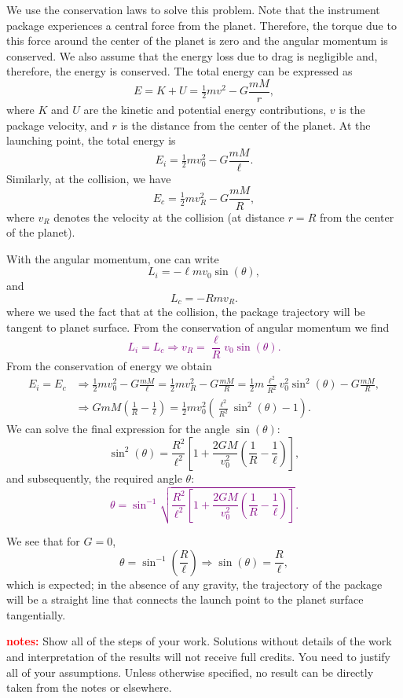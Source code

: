 \documentclass[12pt]{article}
\begin{document}
\begin{ex}
\begin{solution}
  We use the conservation laws to solve this problem. Note that the instrument package experiences a central force from the planet. Therefore, the torque due to this force around the center of the planet is zero and the angular momentum is conserved. We also assume that the energy loss due to drag is negligible and, therefore, the energy is conserved. The total energy can be expressed as
  $$E=K+U=\tfrac{1}{2}mv^2-G\frac{mM}{r},$$
  where $K$ and $U$ are the kinetic and potential energy contributions, $v$ is the package velocity, and $r$ is the distance from the center of the planet. At the launching point, the total energy is
  $$E_i=\tfrac{1}{2}mv_0^2-G\frac{mM}{\ell}.$$
  Similarly, at the collision, we have
  $$E_c=\tfrac{1}{2}mv_R^2-G\frac{mM}{R},$$
  where $v_R$ denotes the velocity at the collision (at distance $r=R$ from the center of the planet).

  With the angular momentum, one can write
  $$L_i=-\ell mv_0\sin(\theta),$$
  and
  $$L_c=-Rmv_R.$$
  where we used the fact that at the collision, the package trajectory will be tangent to planet surface. From the conservation of angular momentum we find\textcolor{purple}{
  $$L_i=L_c\Rightarrow v_R=\frac{\ell}{R}v_0\sin(\theta).$$}%
  From the conservation of energy we obtain
  \begin{align*}
    E_i=E_c&\Rightarrow \tfrac{1}{2}mv_0^2-G\frac{mM}{\ell}=\tfrac{1}{2}mv_R^2-G\frac{mM}{R}=\tfrac{1}{2}m\frac{\ell^2}{R^2}v_0^2\sin^2(\theta)-G\frac{mM}{R},\\
    &\Rightarrow GmM\left(\frac{1}{R}-\frac{1}{\ell}\right)=\tfrac{1}{2}mv_0^2\left(\frac{\ell^2}{R^2}\sin^2(\theta)-1\right).
  \end{align*}
  We can solve the final expression for the angle $\sin(\theta)$:
  $$\sin^2(\theta)=\frac{R^2}{\ell^2}\left[1+\frac{2GM}{v_0^2}\left(\frac{1}{R}-\frac{1}{\ell}\right)\right],$$
  and subsequently, the required angle $\theta$:\textcolor{purple}{
    $$\theta=\sin^{-1}\sqrt{\frac{R^2}{\ell^2}\left[1+\frac{2GM}{v_0^2}\left(\frac{1}{R}-\frac{1}{\ell}\right)\right]}.$$}%

  We see that for $G=0$,
  $$\theta=\sin^{-1}\left(\frac{R}{\ell}\right)\Rightarrow \sin(\theta)=\frac{R}{\ell},$$
  which is expected; in the absence of any gravity, the trajectory of the package will be a straight line that connects the launch point to the planet surface tangentially.
\end{solution}
\end{ex}

\noindent\textbf{\textcolor{red}{notes:} }Show all of the steps of your work. Solutions without details of the work and interpretation of the results will not receive full credits. You need to justify all of your assumptions. Unless otherwise specified, no result can be directly taken from the notes or elsewhere.
\end{document}
